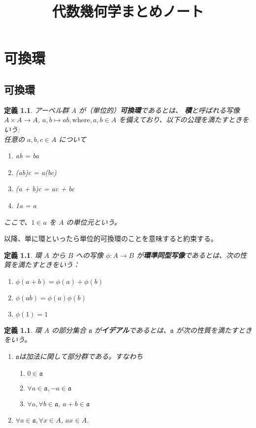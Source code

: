 \documentclass[uplatex, 12pt]{jsreport}
\title{代数幾何学まとめノート}
\date{}
\newtheorem{dfn}[thm]{定義}
\newcommand{\mfa}{\mathfrak{a}}
\begin{document}
\maketitle

\chapter{可換環}

\section{可換環}
\begin{dfn}
アーベル群 A が（単位的）\textbf{可換環}であるとは、
\textbf{積}と呼ばれる写像 $A \times A \to A$, $a, b \mapsto ab, \text{where}, a, b \in A$
を備えており、以下の公理を満たすときをいう: \\

任意の $a, b, c \in A$ について
\begin{enumerate}
    \item ab = ba
    \item (ab)c = a(bc)
    \item (a + b)c = ac + bc
    \item 1a = a
\end{enumerate}
ここで、$1 \in a$ を $A$ の単位元という。
\end{dfn}
以降、単に環といったら単位的可換環のことを意味すると約束する。

\begin{dfn}
    環 $A$ から $B$ への写像 $\phi: A \to B$ が\textbf{環準同型写像}であるとは、次の性質を満たすときをいう：
    \begin{enumerate}
        \item $\phi(a + b) = \phi(a) + \phi(b)$
        \item $\phi(ab) = \phi(a)\phi(b)$
        \item $\phi(1) = 1$
    \end{enumerate}
\end{dfn}

\begin{dfn}
    環 $A$ の部分集合 $\mfa$ が\textbf{イデアル}であるとは、$\mfa$ が次の性質を満たすときをいう。
    \begin{enumerate}
        \item $\mfa$は加法に関して部分群である。すなわち
        \begin{enumerate}
            \item $0 \in \mfa$
            \item $\forall a \in \mfa, -a \in \mfa$
            \item $\forall a, \forall b \in \mfa$, $a + b \in \mfa$
        \end{enumerate}
        \item $\forall a \in \mfa, \forall x \in A$, $ax \in A$.
    \end{enumerate}
\end{dfn}
\end{document}
